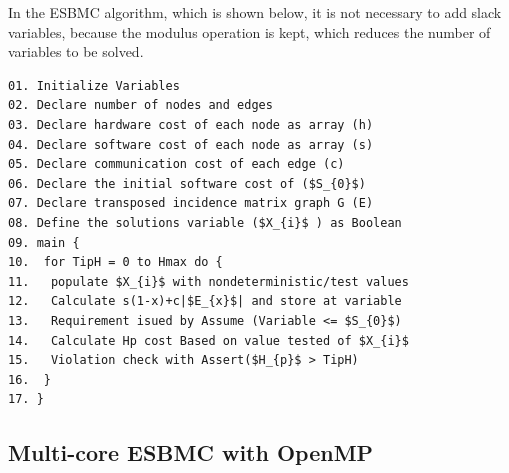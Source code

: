 In the ESBMC algorithm, which is shown below, it is not necessary to add slack variables, because the modulus operation is kept, which reduces the number of variables to be solved. 

\begin{lstlisting}[caption=Pseudocode describing ESBMC, mathescape]
01. Initialize Variables 
02. Declare number of nodes and edges
03. Declare hardware cost of each node as array (h)
04. Declare software cost of each node as array (s)
05. Declare communication cost of each edge (c)
06. Declare the initial software cost of ($S_{0}$)
07. Declare transposed incidence matrix graph G (E)
08. Define the solutions variable ($X_{i}$ ) as Boolean
09. main {
10.  for TipH = 0 to Hmax do {
11.   populate $X_{i}$ with nondeterministic/test values
12.   Calculate s(1-x)+c|$E_{x}$| and store at variable
13.   Requirement isued by Assume (Variable <= $S_{0}$)
14.   Calculate Hp cost Based on value tested of $X_{i}$
15.   Violation check with Assert($H_{p}$ > TipH)
16.  }
17. }
\end{lstlisting}




\subsection{Multi-core ESBMC with OpenMP}
\label{Multi-core-ESBMC-with-OpenMP}

